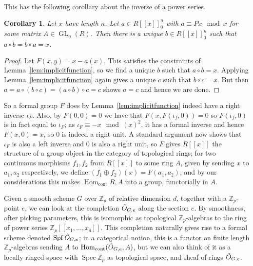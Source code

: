 \documentclass[12pt]{article}
\newcommand{\Z}{\mathbb{Z}}
\DeclareMathOperator{\Hom}{Hom}
\DeclareMathOperator{\Spec}{Spec}
\DeclareMathOperator{\Spf}{Spf}
\DeclareMathOperator{\GL}{GL}
\theoremstyle{plain}
\newtheorem{cor}[thm]{Corollary} %
\theoremstyle{definition}
\theoremstyle{remark}
\begin{document}
This has the following corollary about the inverse of a power series.
\begin{cor}
\label{lem:formalinverse}
Let $x$ have length $n$. Let $a \in R[[x]]_0^n$ with $a \equiv Px \mod x$ for some matrix $A\in \GL_n(R)$. Then there is a unique $b \in R[[x]]_0^n$ such that $a \circ b = b \circ a = x$.
\end{cor}
\begin{proof}
Let $F(x,y) = x - a(x)$. This satisfies the constraints of Lemma~\ref{lem:implicitfunction}, so we find a unique $b$ such that $a \circ b = x$. Applying Lemma~\ref{lem:implicitfunction} again gives a unique $c$ such that $b \circ c = x$. But then $a = a \circ (b \circ c) = (a \circ b) \circ c = c$ shows $a = c$ and hence we are done.
\end{proof}
So a formal group $F$ does by Lemma~\ref{lem:implicitfunction} indeed have a right inverse $\iota_F$. Also, by $F(0,0) = 0$ we have that $F(x,F(\iota_f,0)) = 0$ so $F(\iota_f,0)$ is in fact equal to $\iota_F$; as $\iota_F \equiv -x \mod (x)^2$, it has a formal inverse and hence $F(x,0) = x$, so $0$ is indeed a right unit. A standard argument now shows that $\iota_F$ is also a left inverse and $0$ is also a right unit, so $F$ gives $R[[x]]$ the structure of a group object in the category of topological rings; for two continuous morphisms $f_1,f_2$ from $R[[x]]$ to some ring $A$, given by sending $x$ to $a_1,a_2$ respectively, we define $(f_1 \oplus f_2)(x) = F(a_1,a_2)$, and by our considerations this makes $\Hom_{\text{cont}}{R,A}$ into a group, functorially in $A$.

Given a smooth scheme $G$ over $\Z_p$ of relative dimension $d$, together with a $\Z_p$-point $e$, we can look at the completion $\Hat{O}_{G,e}$ along the section $e$. By smoothness, after picking parameters, this is isomorphic as topological $\Z_p$-algebras to the ring of power series $\Z_p[[x_1,\dots,x_d]]$. This completion naturally gives rise to a formal scheme denoted $\Spf \Hat{O}_{G,e}$; in a categorical notion, this is a functor on finite length $\Z_p$-algebras sending $A$ to $\Hom_{\text{cont}}(\Hat{O}_{G,e},A)$, but we can also think of it as a locally ringed space with $\Spec \Z_p$ as topological space, and sheaf of rings $\Hat{O}_{G,e}$. 
\end{document}
